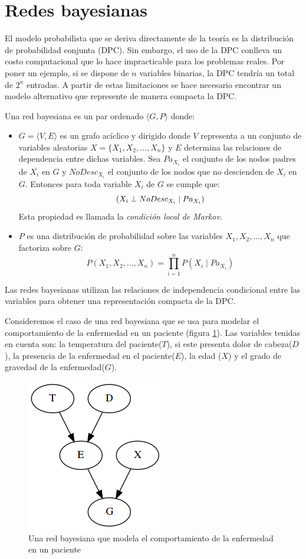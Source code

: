 \section{Redes bayesianas}
El modelo probabilista que se deriva directamente de la teoría es la distribución de probabilidad conjunta (DPC). Sin embargo, el uso de la DPC conlleva un costo computacional que lo hace impracticable para los problemas reales. Por poner un ejemplo, si se dispone de $n$ variables binarias, la DPC tendría un total de $2^n$ entradas. A partir de estas limitaciones se hace necesario encontrar un modelo alternativo que represente de manera compacta la DPC.

\begin{dfn}
	Una red bayesiana es un par ordenado $\langle G,P\rangle$ donde:
	\begin{itemize}
		\item $G=\langle V,E \rangle$ es un grafo acíclico y dirigido donde $V$ representa a un conjunto de variables aleatorias $X = \{X_1, X_2, ..., X_n\}$ y $E$ determina las relaciones de dependencia entre dichas variables. Sea $Pa_{X_i}$ el conjunto de los nodos padres de $X_i$ en $G$ y $NoDesc_{X_i}$ el conjunto de los nodos que no descienden de $X_i$ en $G$. Entonces para toda variable $X_i$ de $G$ se cumple que: \[(X_i \perp NoDesc_{X_i} \mid Pa_{X_i})\]
		Esta propiedad es llamada la \textit{condición local de Markov}.
		
		\item $P$ es una distribución de probabilidad sobre las variables $X_1, X_2, ..., X_n$ que factoriza sobre $G$:
		\[ P(X_1,X_2,...,X_n)=\prod^{n}_{i=1}P(X_i \mid Pa_{X_i}) \]
	\end{itemize}
\end{dfn}

Las redes bayesianas \cite{pearl1985bayesian} utilizan las relaciones de independencia condicional entre las variables para obtener una representación compacta de la DPC.

Consideremos el caso de una red bayesiana que se usa para modelar el comportamiento de la enfermedad en un paciente (figura \ref{fig:bn-example}). Las variables tenidas en cuenta son: la temperatura del paciente($T$), si este presenta dolor de cabeza($D$), la presencia de la enfermedad en el paciente($E$), la edad ($X$) y el grado de gravedad de la enfermedad($G$).	

\begin{figure}[h!]
	\centering
	\includegraphics[width=0.3\linewidth]{./images/Chapter 2/bn-example.png}
	\caption{Una red bayesiana que modela el comportamiento de la enfermedad en un paciente}
	\label{fig:bn-example}
\end{figure}

